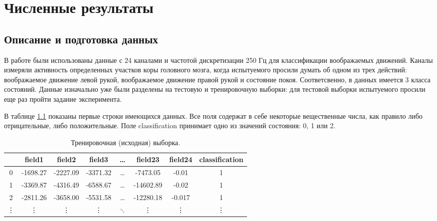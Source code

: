 \chapter{Численные результаты}
\section{Описание и подготовка данных}
\indent В работе были использованы данные с 24 каналами и частотой дискретизации 250 Гц для классификации воображаемых движений. Каналы измеряли активность определенных участков коры головного мозга, когда испытуемого просили думать об одном из трех действий: воображаемое движение левой рукой,  воображаемое движение правой рукой и состояние покоя. Соответсвенно, в данных имеется 3 класса состояний. Данные изначально уже были разделены на тестовую и тренировочную выборки: для тестовой выборки испытуемого просили еще раз пройти задание эксперимента.
 
В таблице \ref{tbl:train_data} показаны первые строки имеющихся данных. Все поля содержат в себе некоторые вещественные числа, как правило либо отрицательные, либо положительные. Поле classification принимает одно из значений состояния:  0, 1 или 2.

\begin{table}[h!]
\caption{Тренировочная (исходная) выборка.} \label{tbl:train_data} 
 \begin{center}
  \begin{tabular}{|c|c|c|c|c|c|c|c|}
	\hline  & field1 & field2  & field3 & \ldots & field23 & field24 & classification \\ 
	\hline 0 & -1698.27 & -2227.09 &-3371.32 & \ldots & -7473.05 & -0.01  & 1 \\ 
	\hline 1 & -3369.87 & -4316.49 & -6588.67 & \ldots & -14602.89 & -0.02 & 1  \\
	\hline 2 & -2811.26 & -3658.00 & -5531.58 & \ldots & -12280.18 & -0.017 & 1 \\
	\hline  \vdots & \vdots & \vdots  & \vdots & $\ddots$ & \vdots & \vdots & \vdots \\ 
	\hline 
  \end{tabular} 
 \end{center}
\end{table}

